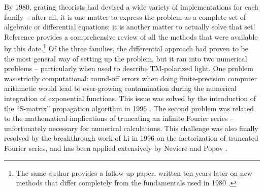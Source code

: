 By 1980, grating theorists had devised a wide variety of implementations for each family -- after all, it is one matter to express the problem as a complete set of algebraic or differential equations; it is another matter to actually solve that set!  Reference \cite{} provides a comprehensive review of all the methods that were available by this date.\footnote{The same author provides a follow-up paper, written ten years later on new methods that differ completely from the fundamentals used in 1980 \cite{Pet90}.}  Of the three families, the differential approach had proven to be the most general way of setting up the problem, but it ran into two numerical problems -- particularly when used to describe TM-polarized light.  One problem was strictly computational: round-off errors when doing finite-precision computer arithmetic would lead to ever-growing contamination during the numerical integration of exponential functions.  This issue was solved by the introduction of the ``S-matrix'' propagation algorithm in 1996 \cite{Li96}\cite{Mon98}.  The second problem was related to the mathematical implications of truncating an infinite Fourier series -- unfortunately necessary for numerical calculations.  This challenge was also finally resolved by the breakthrough work of Li \cite{Li96b} in 1996 on the factorization of truncated Fourier series, and has been applied extensively by Neviere and Popov \cite{Pop01}\cite{Nev02}.

